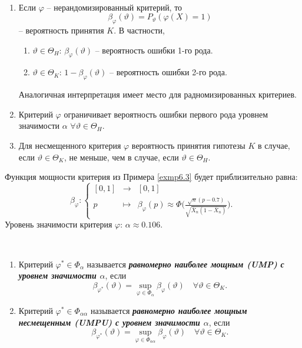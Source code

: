 \begin{rmrk} \
	\begin{enumerate}
		\item Если $\varphi$ -- нерандомизированный критерий, то
		\[ \beta_\varphi(\vartheta) = P_\vartheta(\varphi(X) = 1) \]
		-- вероятность принятия $K$. В частности,
		\begin{enumerate}
			\item $\vartheta \in \Theta_H$: $\beta_\varphi(\vartheta)$ -- вероятность ошибки 1-го рода.
			\item $\vartheta \in \Theta_K$: $1-\beta_\varphi(\vartheta)$ -- вероятность ошибки 2-го рода.
		\end{enumerate}
		Аналогичная интерпретация имеет место для радномизированных критериев.
		\item Критерий $\varphi$ ограничивает вероятность ошибки первого рода уровнем значимости $\alpha$ $\forall \vartheta \in \Theta_H$.
		\item Для несмещенного критерия $\varphi$ вероятность принятия гипотезы $K$ в случае, если $\vartheta \in \Theta_K$, не меньше, чем в случае, если $\vartheta \in \Theta_H$.
	\end{enumerate}
\end{rmrk}

\begin{exmp}
	Функция мощности критерия из Примера \ref{exmp6.3} будет приблизительно равна:
	\[ \beta_\varphi:
	\left \{
	\begin{array}{ccl}
	[0, 1] & \rightarrow & [0, 1] \\
	p & \mapsto & \beta_\varphi(p) \approx \Phi\Big(\frac{\sqrt{n}(p-0.7)}{\sqrt{\overline{X}_n (1-\overline{X}_n)}}\Big).
	\end{array}
	\right.
	\]
	Уровень значимости критерия $\varphi$: $\alpha \approx 0.106$.
\end{exmp}

\begin{defn} \
	\begin{enumerate}
		\item Критерий $\varphi^* \in \Phi_\alpha$ называется \textbf{\textit{равномерно наиболее мощным (UMP) с уровнем значимости $\alpha$}}, если
		\[\beta_{\varphi^*}(\vartheta) = \sup_{\varphi \in \Phi_\alpha} \beta_\varphi(\vartheta) \quad \forall \vartheta \in \Theta_K. \]
		\item Критерий $\varphi^* \in \Phi_{\alpha \alpha}$ называется \textbf{\textit{равномерно наиболее мощным несмещенным (UMPU) с уровнем значимости $\alpha$}}, если
		\[\beta_{\varphi^*}(\vartheta) = \sup_{\varphi \in \Phi_{\alpha\alpha}} \beta_\varphi(\vartheta) \quad \forall \vartheta \in \Theta_K. \]
	\end{enumerate}
\end{defn}

